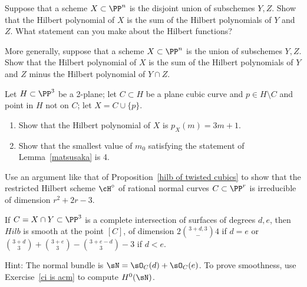 \begin{exercise}\label{deg of disjoint union}
Suppose that a scheme $X\subset \PP^n$ is the disjoint union of subschemes $Y,Z$. Show that the Hilbert polynomial of
$X$ is the sum of the Hilbert polynomials of $Y$ and $Z$. What statement can you make about the Hilbert functions?
\end{exercise}

\begin{exercise}
More generally, suppose that a scheme $X\subset \PP^n$ is the union of subschemes $Y,Z$. Show that the Hilbert polynomial of
$X$ is the sum of the Hilbert polynomials of $Y$ and $Z$ minus the Hilbert polynomial of $Y\cap Z$. 
\end{exercise}

\begin{exercise}
Let $H \subset \PP^3$ be a 2-plane; let $C \subset H$ be a plane cubic curve and $p \in H \setminus C$ and point in $H$ not on $C$; let $X = C \cup \{p\}$.
\begin{enumerate}
\item Show that the Hilbert polynomial of $X$ is $p_X(m) = 3m+1$.
\item Show that the smallest value of $m_0$ satisfying the statement of Lemma~\ref{matsusaka} is 4.
\end{enumerate}
\end{exercise}

\begin{exercise}\label{rational normal hilbert}
Use an  argument like that of Proposition~\ref{hilb of twisted cubics} to show that the restricted Hilbert scheme $\cH^\circ$ of rational normal curves $C \subset \PP^r$ is irreducible of dimension $r^2+2r-3$.
\end{exercise}

\begin{exercise}\label{hilb at a ci}
If $C = X\cap Y\subset \PP^3$ is a complete intersection of surfaces of degrees $d,e$, then
$Hilb$ is smooth at the point $[C]$, of dimension $2\binom{3+d,3}-4$ if $d=e$
or $\binom{3+d}{3} +\binom{3+e}{3} -\binom{3+e-d}{3} -3$ if $d<e$.

Hint: The normal bundle is $\sN = \sO_C(d)+\sO_C(e)$. To prove smoothness, use
Exercise~\ref{ci is acm} to compute $H^0(\sN)$.
\end{exercise}

